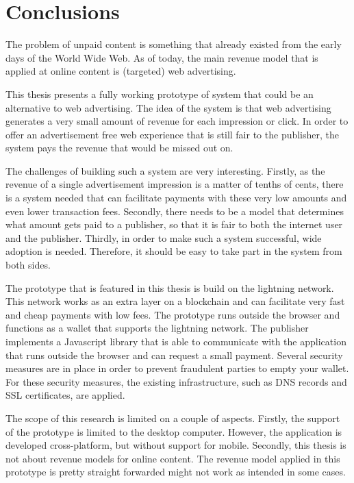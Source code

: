 \chapter{Conclusions}
\label{cha:conclusion}

The problem of unpaid content is something that already existed from the early days of the World Wide Web. As of today, the main revenue model that is applied at online content is (targeted) web advertising.


This thesis presents a fully working prototype of system that could be an alternative to web advertising. The idea of the system is that web advertising generates a very small amount of revenue for each impression or click. In order to offer an advertisement free web experience that is still fair to the publisher, the system pays the revenue that would be missed out on. 

The challenges of building such a system are very interesting. Firstly, as the revenue of a single advertisement impression is a matter of tenths of cents, there is a system needed that can facilitate payments with these very low amounts and even lower transaction fees. Secondly, there needs to be a model that determines what amount gets paid to a publisher, so that it is fair to both the internet user and the publisher. Thirdly, in order to make such a system successful, wide adoption is needed. Therefore, it should be easy to take part in the system from both sides.

The prototype that is featured in this thesis is build on the lightning network. This network works as an extra layer on a blockchain and can facilitate very fast and cheap payments with low fees. The prototype runs outside the browser and functions as a wallet that supports the lightning network. The publisher implements a Javascript library that is able to communicate with the application that runs outside the browser and can request a small payment. Several security measures are in place in order to prevent fraudulent parties to empty your wallet. For these security measures, the existing infrastructure, such as DNS records and SSL certificates, are applied. 

The scope of this research is limited on a couple of aspects. Firstly, the support of the prototype is limited to the desktop computer. However, the application is developed cross-platform, but without support for mobile. Secondly, this thesis is not about revenue models for online content. The revenue model applied in this prototype is pretty straight forwarded might not work as intended in some cases. 

